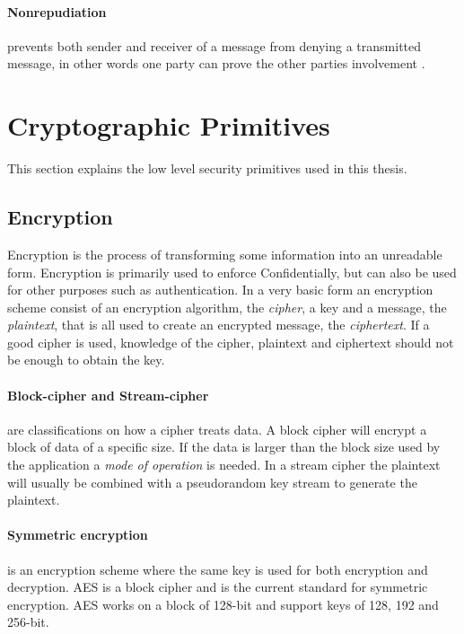 \documentclass[pdftex,english,10pt,b5paper,twoside]{book}
\begin{document}
\paragraph{Nonrepudiation} prevents both sender and receiver of a message
from denying a transmitted message, in other words one party can prove the
other parties involvement \cite{stallings}.

\section{Cryptographic Primitives}

This section explains the low level security primitives used in this thesis.

\subsection{Encryption}

Encryption is the process of transforming some
information into an unreadable form. Encryption is primarily used to enforce
Confidentially, but can also be used for other purposes such as authentication.
In a very basic form an encryption scheme consist of an encryption algorithm,
the \emph{cipher}, a key and a message, the \emph{plaintext}, that is all used
to create an encrypted message, the \emph{ciphertext}. If a good cipher is
used, knowledge of the cipher, plaintext and ciphertext should not be enough to
obtain the key.

\paragraph{Block-cipher and Stream-cipher} are classifications on how a cipher
treats data\cite[p. 32]{stallings}. A block cipher will encrypt a block of data
of a specific size. If the data is larger than the block size used by the
application a \emph{mode of operation} is needed. In a stream cipher the
plaintext will usually be combined with a pseudorandom key stream to generate
the plaintext.

\paragraph{Symmetric encryption} is an encryption scheme where the same key is
used for both encryption and decryption\cite[p. 32]{stallings}. \ac{AES} is a
block cipher and is the current standard for symmetric encryption. \ac{AES}
works on a block of 128-bit and support keys of 128, 192 and 256-bit.
\end{document}

